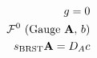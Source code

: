 \documentclass[preview]{standalone}
\begin{document}
\begin{align*}
\special{dvisvgm:raw <g id='unique000'>}g = 0\\\mathcal{F}^0\text{ (Gauge }\mathbf{A},\, b)\\s_{\text{BRST}}\mathbf{A}=D_A c\special{dvisvgm:raw </g>}
\end{align*}
\end{document}
